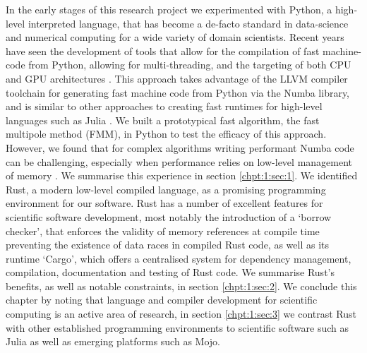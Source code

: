 In the early stages of this research project we experimented with Python, a high-level interpreted language, that has become a de-facto standard in data-science and numerical computing for a wide variety of domain scientists. Recent years have seen the development of tools that allow for the compilation of fast machine-code from Python, allowing for multi-threading, and the targeting of both CPU and GPU architectures \cite{lam2015numba}. This approach takes advantage of the LLVM compiler toolchain for generating fast machine code from Python via the Numba library, and is similar to other approaches to creating fast runtimes for high-level languages such as Julia \cite{bezanson2017julia}. We built a prototypical fast algorithm, the fast multipole method (FMM), in Python to test the efficacy of this approach. However, we found that for complex algorithms writing performant Numba code can be challenging, especially when performance relies on low-level management of memory \cite{kailasa2022pyexafmm}. We summarise this experience in section \ref{chpt:1:sec:1}. We identified Rust, a modern low-level compiled language, as a promising programming environment for our software. Rust has a number of excellent features for scientific software development, most notably the introduction of a `borrow checker', that enforces the validity of memory references at compile time preventing the existence of data races in compiled Rust code, as well as its runtime `Cargo', which offers a centralised system for dependency management, compilation, documentation and testing of Rust code. We summarise Rust's benefits, as well as notable constraints, in section \ref{chpt:1:sec:2}. We conclude this chapter by noting that language and compiler development for scientific computing is an active area of research, in section \ref{chpt:1:sec:3} we contrast Rust with other established programming environments to scientific software such as Julia as well as emerging platforms such as Mojo.